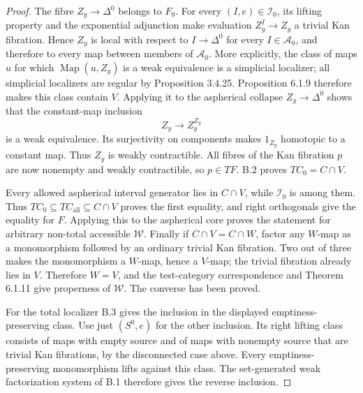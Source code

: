 \begin{proof}
The fibre $Z_y\to\Delta^0$ belongs to $F_0$.  For every
$(I,e)\in\mathcal I_0$, its lifting property and the exponential adjunction
make evaluation $Z_y^I\to Z_y$ a trivial Kan fibration.  Hence $Z_y$ is
local with respect to $I\to\Delta^0$ for every $I\in\mathcal A_0$, and
therefore to every map between members of $\mathcal A_0$.
More explicitly, the class of maps $u$ for which
$\operatorname{Map}(u,Z_y)$ is a weak equivalence is a simplicial localizer;
all simplicial localizers are regular by Proposition 3.4.25.  Proposition
6.1.9 therefore makes this class contain $V$.  Applying it to the
aspherical collapse $Z_y\to\Delta^0$ shows that the constant-map inclusion
\[
 Z_y\longrightarrow Z_y^{Z_y}
\]
is a weak equivalence.  Its surjectivity on components makes $1_{Z_y}$
homotopic to a constant map.  Thus $Z_y$ is weakly contractible.  All fibres
of the Kan fibration $p$ are now nonempty and weakly contractible, so
$p\in TF$.  B.2 proves $TC_0=C\cap V$.

Every allowed aspherical interval generator lies in $C\cap V$, while
$\mathcal I_0$ is among them.  Thus
$TC_0\subseteq TC_{\mathrm{all}}\subseteq C\cap V$ proves the first
equality, and right orthogonals give the equality for $F$.  Applying this
to the aspherical core proves the statement for arbitrary non-total
accessible $\mathcal W$.  Finally if $C\cap V=C\cap W$, factor any
$W$-map as a monomorphism followed by an ordinary trivial Kan fibration.
Two out of three makes the monomorphism a $W$-map, hence a $V$-map; the
trivial fibration already lies in $V$.  Therefore $W=V$, and the
test-category correspondence and Theorem 6.1.11 give properness of
$\mathcal W$.  The converse has been proved.

For the total localizer B.3 gives the inclusion in the displayed
emptiness-preserving class.  Use just $(S^0,e)$ for the other inclusion.
Its right lifting class consists of maps with empty source and of maps
with nonempty source that are trivial Kan fibrations, by the disconnected
case above.  Every emptiness-preserving monomorphism lifts against this
class.  The set-generated weak factorization system of B.1 therefore
gives the reverse inclusion.
\end{proof}

